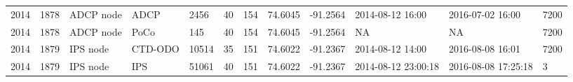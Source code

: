\documentclass[12pt]{dforeport}
\begin{document}
\begin{landscape}
\begin{table}[ht]
\begin{tabular}{p{0.3in}p{.7in}p{.7in}p{.7in}p{.7in}p{.7in}p{.7in}p{.7in}p{.7in}p{.7in}p{.7in}p{.7in}}
2014 & 1878 & ADCP node & ADCP & 2456 & 40 & 154 & 74.6045 & -91.2564 & 2014-08-12 16:00 & 2016-07-02 16:00 & 7200 \\ 
2014 & 1878 & ADCP node & PoCo & 145 & 40 & 154 & 74.6045 & -91.2564 & NA & NA & 7200 \\ 
2014 & 1879 & IPS node & CTD-ODO & 10514 & 35 & 151 & 74.6022 & -91.2367 & 2014-08-12 14:00 & 2016-08-08 16:01 & 7200 \\ 
2014 & 1879 & IPS node & IPS & 51061 & 40 & 151 & 74.6022 & -91.2367 & 2014-08-12 23:00:18 & 2016-08-08 17:25:18 & 3 \\ 
\hline
\end{tabular}
\end{table}



\end{landscape}
\end{document}

